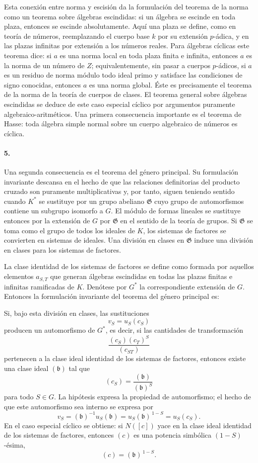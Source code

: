 Esta conexión entre norma y escisión da la formulación del teorema de la norma como un teorema sobre álgebras escindidas: si un álgebra se escinde en toda plaza, entonces se escinde absolutamente. Aquí una plaza se define, como en teoría de números, reemplazando el cuerpo base \(k\) por su extensión \(p\)-ádica, y en las plazas infinitas por extensión a los números reales. Para álgebras cíclicas este teorema dice: si \(a\) es una norma local en toda plaza finita e infinita, entonces \(a\) es la norma de un número de \(Z\); equivalentemente, sin pasar a cuerpos \(p\)-ádicos, si \(a\) es un residuo de norma módulo todo ideal primo y satisface las condiciones de signo conocidas, entonces \(a\) es una norma global. Éste es precisamente el teorema de la norma de la teoría de cuerpos de clases. El teorema general sobre álgebras escindidas se deduce de este caso especial cíclico por argumentos puramente algebraico-aritméticos. Una primera consecuencia importante es el teorema de Hasse: toda álgebra simple normal sobre un cuerpo algebraico de números es cíclica.

\paragraph{5.}
Una segunda consecuencia es el teorema del género principal. Su formulación invariante descansa en el hecho de que las relaciones definitorias del producto cruzado son puramente multiplicativas y, por tanto, siguen teniendo sentido cuando \(K^*\) se sustituye por un grupo abeliano \(\mathfrak G\) cuyo grupo de automorfismos contiene un subgrupo isomorfo a \(G\). El módulo de formas lineales se sustituye entonces por la extensión de \(G\) por \(\mathfrak G\) en el sentido de la teoría de grupos. Si \(\mathfrak G\) se toma como el grupo de todos los ideales de \(K\), los sistemas de factores se convierten en sistemas de ideales. Una división en clases en \(\mathfrak G\) induce una división en clases para los sistemas de factores.

La clase identidad de los sistemas de factores se define como formada por aquellos elementos \(a_{S,T}\) que generan álgebras escindidas en todas las plazas finitas e infinitas ramificadas de \(K\). Denótese por \(G^*\) la correspondiente extensión de \(G\). Entonces la formulación invariante del teorema del género principal es:

Si, bajo esta división en clases, las sustituciones
\[
        v_S=u_S(c_S)
\]
producen un automorfismo de \(G^*\), es decir, si las cantidades de transformación
\[
        \frac{(c_S)(c_T)^S}{(c_{ST})}
\]
pertenecen a la clase ideal identidad de los sistemas de factores, entonces existe una clase ideal \((\mathfrak b)\) tal que
\[
        (c_S)=\frac{(\mathfrak b)}{(\mathfrak b)^S}
\]
para todo \(S\in G\). La hipótesis expresa la propiedad de automorfismo; el hecho de que este automorfismo sea interno se expresa por
\[
        v_S=(\mathfrak b)^{-1}u_S(\mathfrak b)
        =u_S(\mathfrak b)^{\,1-S}=u_S(c_S).
\]
En el caso especial cíclico se obtiene: si \(N([c])\) yace en la clase ideal identidad de los sistemas de factores, entonces \((c)\) es una potencia simbólica \((1-S)\)-ésima,
\[
        (c)=(\mathfrak b)^{\,1-S}.
\]

